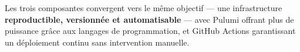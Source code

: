 \documentclass[12pt,a4paper]{article}
\begin{document}
\vspace{0.5em}

Les trois composantes convergent vers le même objectif --- une infrastructure
\textbf{reproductible, versionnée et automatisable} --- avec Pulumi offrant
plus de puissance grâce aux langages de programmation, et GitHub Actions
garantissant un déploiement continu sans intervention manuelle.
\end{document}
